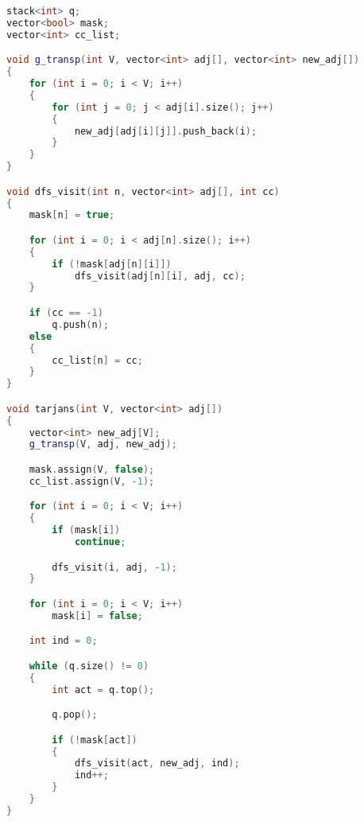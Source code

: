 \documentclass[leter]{amsart}
\begin{document}
\begin{multicols}{2}
\begin{lstlisting}[language=C++]
stack<int> q;
vector<bool> mask;
vector<int> cc_list;

void g_transp(int V, vector<int> adj[], vector<int> new_adj[])
{
    for (int i = 0; i < V; i++)
    {
        for (int j = 0; j < adj[i].size(); j++)
        {
            new_adj[adj[i][j]].push_back(i);
        }
    }
}

void dfs_visit(int n, vector<int> adj[], int cc)
{
    mask[n] = true;

    for (int i = 0; i < adj[n].size(); i++)
    {
        if (!mask[adj[n][i]])
            dfs_visit(adj[n][i], adj, cc);
    }

    if (cc == -1)
        q.push(n);
    else
    {
        cc_list[n] = cc;
    }
}

void tarjans(int V, vector<int> adj[])
{
    vector<int> new_adj[V];
    g_transp(V, adj, new_adj);

    mask.assign(V, false);
    cc_list.assign(V, -1);

    for (int i = 0; i < V; i++)
    {
        if (mask[i])
            continue;

        dfs_visit(i, adj, -1);
    }

    for (int i = 0; i < V; i++)
        mask[i] = false;

    int ind = 0;

    while (q.size() != 0)
    {
        int act = q.top();

        q.pop();

        if (!mask[act])
        {
            dfs_visit(act, new_adj, ind);
            ind++;
        }
    }
}

\end{lstlisting}
\end{multicols}
\end{document}
